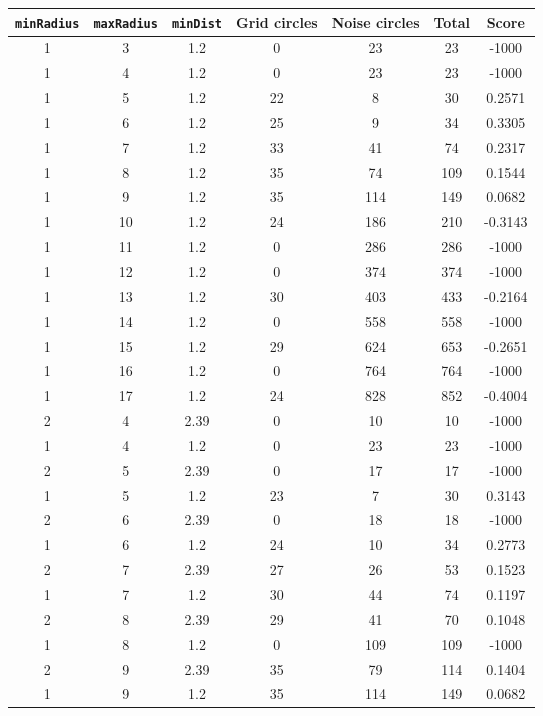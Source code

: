 \documentclass[letterpaper, 12pt]{article}
\begin{document}
\begin{longtable}{|c|c|c|c|c|c|c|}
\hline
\textbf{\texttt{minRadius}} & \textbf{\texttt{maxRadius}} & \textbf{\texttt{minDist}} & \textbf{Grid circles} & \textbf{Noise circles} & \textbf{Total} & \textbf{Score} \\
\hline
1 & 3 & 1.2 & 0 & 23 & 23 & -1000 \\
\hline
1 & 4 & 1.2 & 0 & 23 & 23 & -1000 \\
\hline
1 & 5 & 1.2 & 22 & 8 & 30 & 0.2571 \\
\hline
1 & 6 & 1.2 & 25 & 9 & 34 & 0.3305 \\
\hline
1 & 7 & 1.2 & 33 & 41 & 74 & 0.2317 \\
\hline
1 & 8 & 1.2 & 35 & 74 & 109 & 0.1544 \\
\hline
1 & 9 & 1.2 & 35 & 114 & 149 & 0.0682 \\
\hline
1 & 10 & 1.2 & 24 & 186 & 210 & -0.3143 \\
\hline
1 & 11 & 1.2 & 0 & 286 & 286 & -1000 \\
\hline
1 & 12 & 1.2 & 0 & 374 & 374 & -1000 \\
\hline
1 & 13 & 1.2 & 30 & 403 & 433 & -0.2164 \\
\hline
1 & 14 & 1.2 & 0 & 558 & 558 & -1000 \\
\hline
1 & 15 & 1.2 & 29 & 624 & 653 & -0.2651 \\
\hline
1 & 16 & 1.2 & 0 & 764 & 764 & -1000 \\
\hline
1 & 17 & 1.2 & 24 & 828 & 852 & -0.4004 \\
\hline
2 & 4 & 2.39 & 0 & 10 & 10 & -1000 \\
\hline
1 & 4 & 1.2 & 0 & 23 & 23 & -1000 \\
\hline
2 & 5 & 2.39 & 0 & 17 & 17 & -1000 \\
\hline
1 & 5 & 1.2 & 23 & 7 & 30 & 0.3143 \\
\hline
2 & 6 & 2.39 & 0 & 18 & 18 & -1000 \\
\hline
1 & 6 & 1.2 & 24 & 10 & 34 & 0.2773 \\
\hline
2 & 7 & 2.39 & 27 & 26 & 53 & 0.1523 \\
\hline
1 & 7 & 1.2 & 30 & 44 & 74 & 0.1197 \\
\hline
2 & 8 & 2.39 & 29 & 41 & 70 & 0.1048 \\
\hline
1 & 8 & 1.2 & 0 & 109 & 109 & -1000 \\
\hline
2 & 9 & 2.39 & 35 & 79 & 114 & 0.1404 \\
\hline
1 & 9 & 1.2 & 35 & 114 & 149 & 0.0682 \\

\end{longtable}
\end{document}
